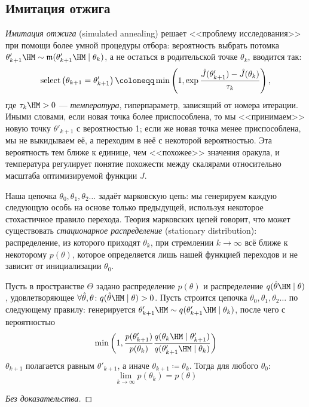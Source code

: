 \subsection{Имитация отжига}

\emph{Имитация отжига} (simulated annealing) решает <<проблему исследования>> при помощи более умной процедуры отбора: вероятность выбрать потомка $\theta'_{k+1} \HM \sim \mut(\theta'_{k+1} \HM\mid \theta_k)$, а не остаться в родительской точке $\theta_k$, вводится так:
$$\Sel \left( \theta_{k+1} = \theta'_{k+1} \right) \coloneqq \min \left(1, \exp{\frac{\hat{J}(\theta'_{k+1}) - \hat{J}(\theta_k)}{\tau_k}} \right),$$
где $\tau_k \HM> 0$ --- \emph{температура}, гиперпараметр, зависящий от номера итерации. Иными словами, если новая точка более приспособлена, то мы <<принимаем>> новую точку $\theta'_{k+1}$ с вероятностью 1; если же новая точка менее приспособлена, мы не выкидываем её, а переходим в неё с некоторой вероятностью. Эта вероятность тем ближе к единице, чем <<похожее>> значения оракула, и температура регулирует понятие похожести между скалярами относительно масштаба оптимизируемой функции $J$.

Наша цепочка $\theta_0, \theta_1, \theta_2 \dots$ задаёт марковскую цепь: мы генерируем каждую следующую особь на основе только предыдущей, используя некоторое стохастичное правило перехода. Теория марковских цепей говорит, что может существовать \emph{стационарное распределение} (stationary distribution): распределение, из которого приходят $\theta_k$, при стремлении $k \to \infty$ всё ближе к некоторому $p(\theta)$, которое определяется лишь нашей функцией переходов и не зависит от инициализации $\theta_0$.

\begin{theorem}
Пусть в пространстве $\Theta$ задано распределение $p(\theta)$ и распределение $q(\hat{\theta} \HM\mid \theta)$, удовлетворяющее $\forall \hat{\theta}, \theta \colon q(\hat{\theta} \HM\mid \theta) > 0$. Пусть строится цепочка $\theta_0, \theta_1, \theta_2 \dots$ по следующему правилу: генерируется $\theta'_{k+1} \HM\sim q(\theta'_{k+1} \HM\mid \theta_k)$, после чего с вероятностью
$$\min \left( 1, \frac{p(\theta'_{k+1})}{p(\theta_{k})}\frac{q(\theta_k \HM\mid \theta'_{k+1})}{q(\theta'_{k+1} \HM\mid \theta_{k})} \right)$$
$\theta_{k+1}$ полагается равным $\theta'_{k+1}$, а иначе $\theta_{k+1} \coloneqq \theta_k$.
Тогда для любого $\theta_0$:
$$\lim_{k \to \infty} p(\theta_k) = p(\theta)$$
\begin{proof}[Без доказательства]
\end{proof}
\end{theorem}

